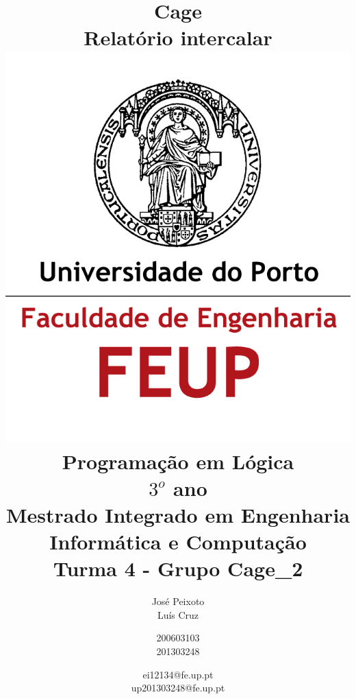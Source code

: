 \documentclass[a4paper,11pt]{article}
\begin{document}
\hypersetup{pageanchor=false}
\begin{titlepage}
\title{\huge \textbf{Cage\\[1cm] \Large Relatório intercalar\\[1cm]
\includegraphics{res/logo.png}\\[1cm] \large Programação em
Lógica\\[0.25cm] \small $3^o$ ano\\[0.05cm]Mestrado Integrado em Engenharia Informática e
Computação\\[1.7cm]}\normalsize Turma 4 - Grupo Cage\_2}

\author{José Peixoto \\Luís Cruz \and 200603103\\201303248 \and ei12134@fe.up.pt
\\ up201303248@fe.up.pt\\[1cm]}
\maketitle
\pagestyle{empty} %
\end{titlepage}
\hypersetup{pageanchor=true}
\end{document}
